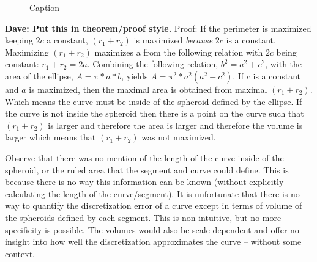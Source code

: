 \begin{figure}[h!]
  \caption{\label{ref:EllipseGeometry} Caption}
\end{figure}

{\bf{Dave:  Put this in theorem/proof style.}}
Proof: If the perimeter is maximized keeping $2c$ a constant, $(r_1 + r_2)$ is maximized \textit{because} $2c$ is a constant.  Maximizing $(r_1+r_2)$ maximizes a from the following relation with $2c$ being constant: $r_1 + r_2 = 2a$.  Combining the following relation, $b^2 = a^2 + c^2$, with the area of the ellipse, $A = \pi * a * b$, yields $A=\pi^{2}*a^{2}(a^{2} - c^2)$.  If $c$ is a constant and $a$ is maximized, then the maximal area is obtained from maximal $(r_1+r_2)$.  Which means the curve must be inside of the spheroid defined by the ellipse.  If the curve is not inside the spheroid then there is a point on the curve such that $(r_1+r_2)$ is larger and therefore the area is larger and therefore the volume is larger which means that $(r_1+r_2)$ was not maximized.

Observe that there was no mention of the length of the curve inside of the spheroid, or the ruled area that the segment and curve could define.  This is because there is no way this information can be known (without explicitly calculating the length of the curve/segment).  It is unfortunate that there is no way to quantify the discretization error of a curve except in terms of volume of the spheroids defined by each segment.  This is non-intuitive, but no more specificity is possible.  The volumes would also be scale-dependent and offer no insight into how well the discretization approximates the curve -- without some context.
